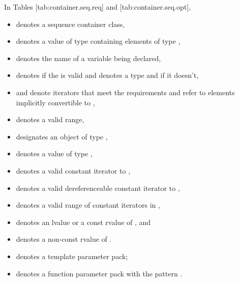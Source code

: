 \documentclass{wg21}
\begin{document}
In Tables [tab:container.seq.req]
and [tab:container.seq.opt],
\begin{itemize}
    \item
     denotes a sequence container class,
    \item
     denotes a value of type  containing elements of type ,
    \item
     denotes the name of a variable being declared,
    \item
     denotes  if
    the   is valid and denotes a
    type and
     if it doesn't,
    \item
     and 
    denote iterators that meet the  requirements
    and refer to elements implicitly convertible to ,
    \item
    \tcode{[i, j)} denotes a valid range,
    \item
     designates an object of type ,
    \item
     denotes a value of type ,
    \item
     denotes a valid constant iterator to ,
    \item
     denotes a valid dereferenceable constant iterator to ,
    \item
    \tcode{[q1, q2)} denotes a valid range of constant iterators in ,
    \item
     denotes an lvalue or a const rvalue of , and
    \item
     denotes a non-const rvalue of .
    \item
     denotes a template parameter pack;
    \item
     denotes a function parameter pack with the pattern .
\end{itemize}
\end{document}
